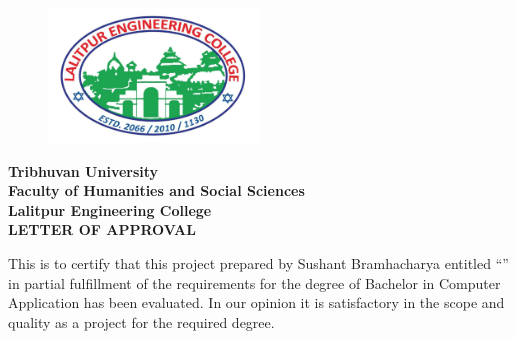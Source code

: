 \begin{figure}
    \centering
    \includegraphics[width=2.2in]{img/Graphics/lec.jpg}
\end{figure}
\begin{center}
    {\fontsize{14pt}{18}\selectfont
    \textbf{Tribhuvan University\\
    Faculty of Humanities and Social Sciences\\
    Lalitpur Engineering College\\
    \vspace{0.2in}
    LETTER OF APPROVAL\\}
    }
\end{center}
This is to certify that this project prepared by Sushant Bramhacharya entitled “\textbf{\thetitle}” in partial fulfillment of the requirements for the degree of Bachelor in Computer Application has been evaluated. In our opinion it is satisfactory in the
scope and quality as a project for the required degree.\\
